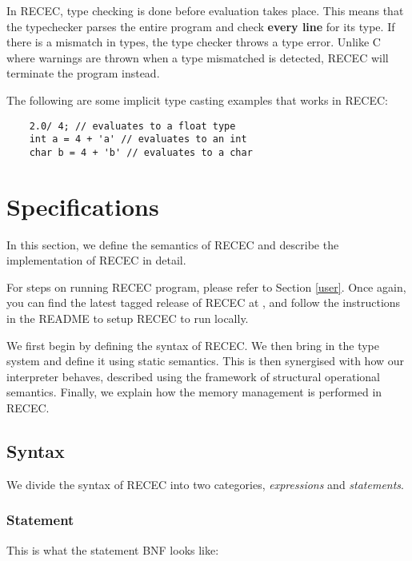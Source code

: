 \documentclass[a4paper]{article}
\begin{document}
In RECEC, type checking is done before evaluation takes place. This means that the typechecker parses the entire program and check \textbf{every line} for its type. If there is a mismatch in types, the type checker throws a type error. Unlike C where warnings are thrown when a type mismatched is detected, RECEC will terminate the program instead.

The following are some implicit type casting examples that works in RECEC:

\begin{verbatim}
	2.0/ 4; // evaluates to a float type
	int a = 4 + 'a' // evaluates to an int
	char b = 4 + 'b' // evaluates to a char
\end{verbatim}

\section{Specifications}

In this section, we define the semantics of RECEC and describe the implementation of  RECEC in detail.

For steps on running RECEC program, please refer to Section \ref{user}.
Once again, you can find the latest tagged release of RECEC at \url{}, and follow the instructions in the README to setup RECEC to run locally.

We first begin by defining the syntax of RECEC.
We then bring in the type system and define it using static semantics.
This is then synergised with how our interpreter behaves, described using the framework of structural operational semantics.
Finally, we explain how the memory management is performed in RECEC.

\subsection{Syntax}

We divide the syntax of RECEC into two categories, \textit{expressions} and \textit{statements}.

\subsubsection{Statement}
\label{statement}
This is what the statement BNF looks like:
\end{document}
